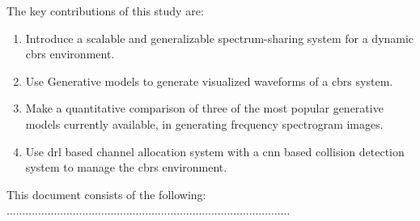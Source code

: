 The key contributions of this study are:
\begin{enumerate}
    \item Introduce a scalable and generalizable spectrum-sharing system for a dynamic \gls{cbrs} environment.
    \item Use Generative models to generate visualized waveforms of a \gls{cbrs} system.
    \item Make a quantitative comparison of three of the most popular generative models currently available, in generating frequency spectrogram images.
    \item Use \gls{drl} based channel allocation system with a \gls{cnn} based collision detection system to manage the \gls{cbrs} environment.
\end{enumerate}


This document consists of the following: ..........................................................................................

